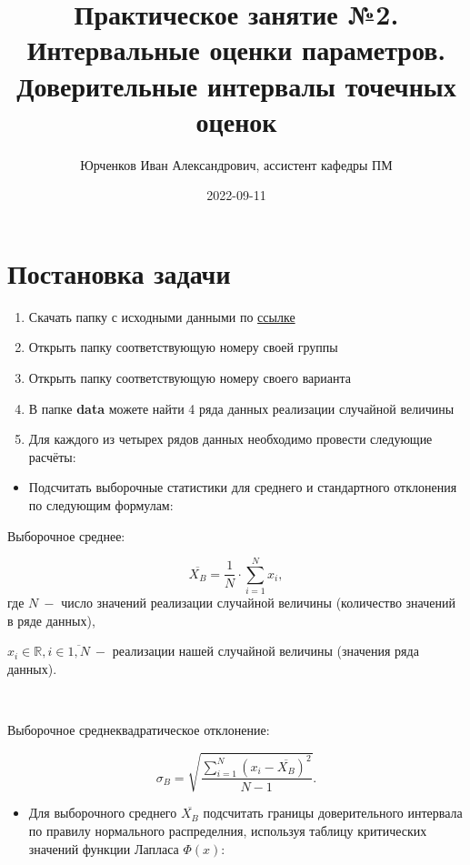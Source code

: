 \documentclass[
]{article}
\title{Практическое занятие №2. Интервальные оценки параметров.
Доверительные интервалы точечных оценок}
\author{Юрченков Иван Александрович, ассистент кафедры ПМ}
\date{2022-09-11}
\providecommand{\tightlist}{%
  \setlength{\itemsep}{0pt}\setlength{\parskip}{0pt}}
\begin{document}
\maketitle

\hypertarget{ux43fux43eux441ux442ux430ux43dux43eux432ux43aux430-ux437ux430ux434ux430ux447ux438}{%
\section{\texorpdfstring{\textbf{Постановка
задачи}}{Постановка задачи}}\label{ux43fux43eux441ux442ux430ux43dux43eux432ux43aux430-ux437ux430ux434ux430ux447ux438}}

\begin{enumerate}
\def\labelenumi{\arabic{enumi}.}
\item
  Скачать папку с исходными данными по
  \href{https://disk.yandex.ru/d/PwFd-L8zn7x8eQ}{ссылке}
\item
  Открыть папку соответствующую номеру своей группы
\item
  Открыть папку соответствующую номеру своего варианта
\item
  В папке \textbf{data} можете найти 4 ряда данных реализации случайной
  величины
\item
  Для каждого из четырех рядов данных необходимо провести следующие
  расчёты:
\end{enumerate}

\begin{itemize}
\tightlist
\item
  Подсчитать выборочные статистики для среднего и стандартного
  отклонения по следующим формулам:
\end{itemize}

Выборочное среднее:

\[
  \overline{X_{B}} = \frac{1}{N} \cdot \sum_{i=1}^{N} x_i,
\] где \(N \ -\) число значений реализации случайной величины
(количество значений в ряде данных),

\(x_i \in \mathbb{R}, i \in \overline{1, N} \ -\) реализации нашей
случайной величины (значения ряда данных).

~

Выборочное среднеквадратическое отклонение:

\[
\sigma_{B} = \sqrt{\frac{\sum_{i=1}^{N}\left( x_i - \overline{X_{B}}  \right)^2}{N-1}}.
\]

\begin{itemize}
\tightlist
\item
  Для выборочного среднего \(\overline{X_{B}}\) подсчитать границы
  доверительного интервала по правилу нормального распределния,
  используя таблицу критических значений функции Лапласа \(\Phi(x)\):
\end{itemize}
\end{document}
